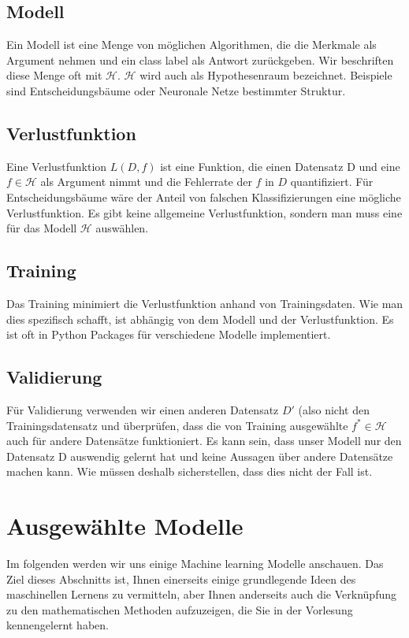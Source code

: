 \subsection{Modell}
Ein Modell ist eine Menge von möglichen Algorithmen, die die Merkmale als Argument nehmen 
und ein class label als Antwort zurückgeben. Wir beschriften diese Menge oft 
mit $\mathcal{H}$. $\mathcal{H}$ wird auch als Hypothesenraum bezeichnet. 
Beispiele sind Entscheidungsbäume oder Neuronale Netze bestimmter Struktur. 

\subsection{Verlustfunktion}
Eine Verlustfunktion $L(D,f)$ ist eine Funktion, die einen Datensatz D und eine $f \in \mathcal{H}$ als Argument nimmt und die Fehlerrate der $f$ in $D$ quantifiziert. 
Für Entscheidungsbäume wäre der Anteil von falschen Klassifizierungen eine mögliche Verlustfunktion. Es gibt keine allgemeine Verlustfunktion, sondern man muss eine für das Modell $\mathcal{H}$ auswählen.

\subsection{Training}
Das Training minimiert die Verlustfunktion anhand von Trainingsdaten. Wie man dies spezifisch schafft, ist abhängig von dem Modell und der Verlustfunktion. Es ist oft in Python Packages für verschiedene Modelle implementiert.

\subsection{Validierung}
Für Validierung verwenden wir einen anderen Datensatz $D'$ (also nicht den Trainingsdatensatz und überprüfen, 
dass die von Training ausgewählte $f^* \in \mathcal{H}$ auch für andere Datensätze funktioniert. 
Es kann sein, dass unser Modell nur den Datensatz D auswendig gelernt hat und keine Aussagen über andere Datensätze machen kann. 
Wie müssen deshalb sicherstellen, dass dies nicht der Fall ist.


\section{Ausgewählte Modelle}

Im folgenden werden wir uns einige Machine learning Modelle anschauen. Das Ziel dieses Abschnitts ist, 
Ihnen einerseits einige grundlegende Ideen des maschinellen Lernens zu vermitteln, aber Ihnen anderseits auch 
die Verknüpfung zu den mathematischen Methoden aufzuzeigen, die Sie in der Vorlesung kennengelernt haben.

